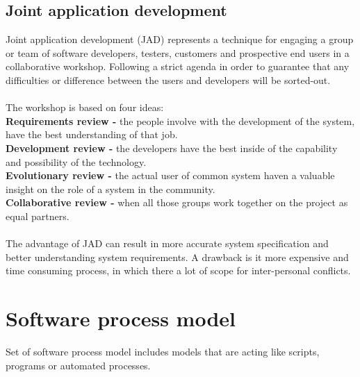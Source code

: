 \subsection{Joint application development}
Joint application development (JAD) represents a technique for engaging a group or team of software developers, testers, customers and prospective end users in a collaborative workshop. Following a strict agenda in order to guarantee that any difficulties or difference between the users and developers will be sorted-out.\\ \\
The workshop is based on four ideas:\\
{\bf Requirements review -} the people involve with the development of the system, have the best understanding of that job.\\
{\bf Development review -} the developers have the best inside of the capability and possibility of the technology.\\
{\bf Evolutionary review  -} the actual user of common system haven a valuable insight on the role of a system in the community.\\
{\bf Collaborative review -} when all those groups work together on the project as equal partners.\\
\\
The advantage of JAD can result in more accurate system specification and better understanding system requirements. A drawback is it more expensive and time consuming process, in which there a lot of scope for inter-personal conflicts.
\newpage
\section{Software process model}
Set of software process model includes models that are acting like scripts, programs or automated processes.
